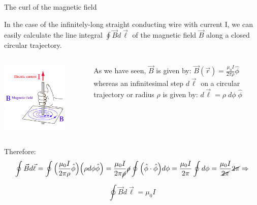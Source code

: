 \begin{frame}{The curl of the magnetic field}

In the case of the infinitely-long straight conducting wire with current I,
we can easily calculate the line integral $\oint \vec{B}  d\vec{\ell}$  of the magnetic field
$\vec{B}$ along a closed circular trajectory.\\
\vspace{0.1cm}

\begin{columns}
  \begin{column}{0.30\textwidth}
    \includegraphics[width=0.77\textwidth]{./images/schematics/magnetic_field_around_wire_01.png}
  \end{column}
  \begin{column}{0.70\textwidth}
      As we have seen, $\vec{B}$ is given by:
      $\vec{B}(\vec{r}) = \frac{\mu_0I}{2\pi \rho} \hat{\phi}$
      whereas an infinitesimal step $d\vec{\ell}$ on a circular trajectory or radius $\rho$ is given by:
      $d\vec{\ell} = \rho \; d\phi \; \hat{\phi}$
  \end{column}
\end{columns}

\vspace{0.2cm}

Therefore:
\begin{equation*}
   \oint \vec{B}  d\vec{\ell} =
      \oint \Big(  \frac{\mu_0I}{2\pi \rho} \hat{\phi} \Big) \Big( \rho d\phi \hat{\phi} \Big) =
      \frac{\mu_0I}{2\pi \cancel{\rho}} \cancel{\rho}  \oint \Big( \hat{\phi} \cdot \hat{\phi} \Big) d\phi =
      \frac{\mu_0I}{2\pi} \oint d\phi =
      \frac{\mu_0I}{\cancel{2\pi}} \cancel{2\pi} \Rightarrow
\end{equation*}

\begin{equation*}
   \oint \vec{B}  d\vec{\ell} = \mu_0 I
\end{equation*}

\end{frame}

